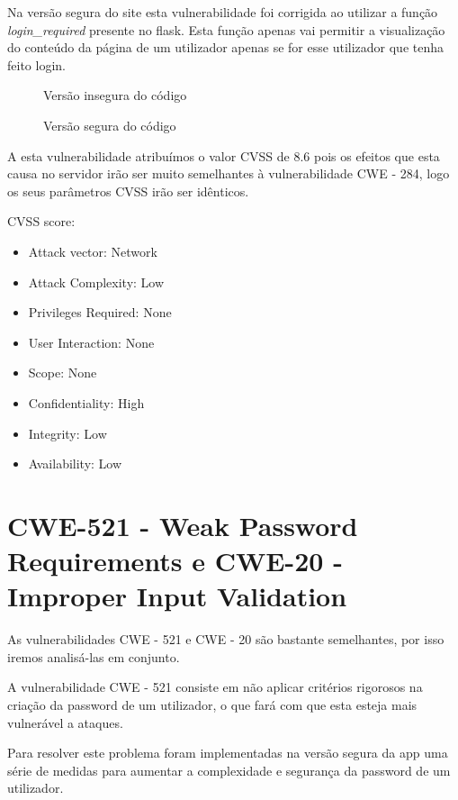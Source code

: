 \documentclass[12pt]{report}
\begin{document}
Na versão segura do site esta vulnerabilidade foi corrigida ao utilizar a função \emph{login\_required} presente no flask. Esta função apenas vai permitir a visualização do conteúdo da página de um utilizador apenas se for esse utilizador que tenha feito login.

\begin{figure}[H]{
\centering
{
\caption{Versão insegura do código}
}
}\end{figure}

\begin{figure}[H]{
\centering
{
\caption{Versão segura do código}
}
}\end{figure}
A esta vulnerabilidade atribuímos o valor CVSS de 8.6 pois os efeitos que esta causa no servidor irão ser muito semelhantes à vulnerabilidade CWE - 284, logo os seus parâmetros CVSS irão ser idênticos.\par
CVSS score: \begin{itemize}
  \item Attack vector: Network
  \item Attack Complexity: Low
  \item Privileges Required: None
  \item User Interaction: None
  \item Scope: None
  \item Confidentiality: High
  \item Integrity: Low
  \item Availability: Low
\end{itemize}

\newpage
\section{CWE-521 - Weak Password Requirements e CWE-20 - Improper Input Validation} \label{521}
As vulnerabilidades CWE - 521 e CWE - 20 são bastante semelhantes, por isso iremos analisá-las em conjunto. \par
A vulnerabilidade CWE - 521 consiste em não aplicar critérios rigorosos na criação da password de um utilizador, o que fará com que esta esteja mais vulnerável a ataques.\par
Para resolver este problema foram implementadas na versão segura da app uma série de medidas para aumentar a complexidade e segurança da password de um utilizador.\par
\end{document}
